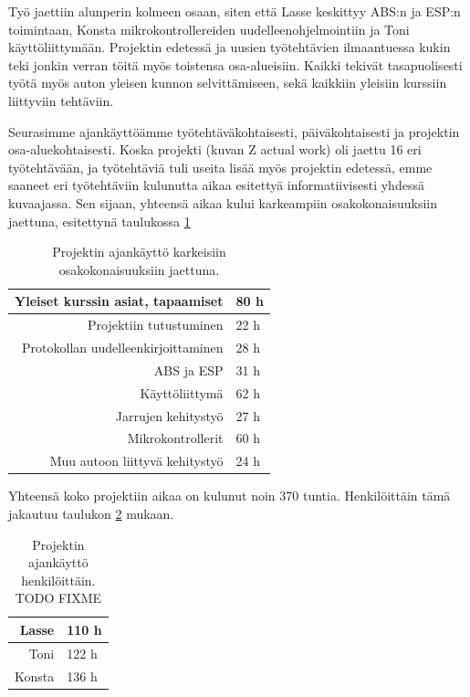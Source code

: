 \documentclass{article}
\begin{document}
Työ jaettiin alunperin kolmeen osaan, siten että Lasse keskittyy ABS:n ja ESP:n toimintaan, Konsta mikrokontrollereiden uudelleenohjelmointiin ja Toni käyttöliittymään. Projektin edetessä ja uusien työtehtävien ilmaantuessa kukin teki jonkin verran töitä myös toistensa osa-alueisiin. Kaikki tekivät tasapuolisesti työtä myös auton yleisen kunnon selvittämiseen, sekä kaikkiin yleisiin kurssiin liittyviin tehtäviin.

Seurasimme ajankäyttöämme työtehtäväkohtaisesti, päiväkohtaisesti ja projektin osa-aluekohtaisesti. Koska projekti (kuvan Z actual work) oli jaettu 16 eri työtehtävään, ja työtehtäviä tuli useita lisää myös projektin edetessä, emme saaneet eri työtehtäviin kulunutta aikaa esitettyä informatiivisesti yhdessä kuvaajassa. Sen sijaan, yhteensä aikaa kului karkeampiin osakokonaisuuksiin jaettuna, esitettynä taulukossa \ref{tab:osakok-ajat}

\begin{table}
	\caption{Projektin ajankäyttö karkeisiin osakokonaisuuksiin jaettuna.}
	\label{tab:osakok-ajat}
	\centering \begin{tabular}{ | r | l | } \hline
	Yleiset kurssin asiat, tapaamiset & 80 h\\ \hline
	Projektiin tutustuminen & 22 h\\ \hline
	Protokollan uudelleenkirjoittaminen & 28 h\\ \hline
	ABS ja ESP & 31 h\\ \hline
	Käyttöliittymä & 62 h\\ \hline
	Jarrujen kehitystyö & 27 h\\ \hline
	Mikrokontrollerit & 60 h\\ \hline
	Muu autoon liittyvä kehitystyö & 24 h\\ \hline
	\end{tabular}
\end{table}


Yhteensä koko projektiin aikaa on kulunut noin 370 tuntia. Henkilöittäin tämä jakautuu taulukon \ref{tab:henk-ajat} mukaan.

\begin{table}
	\caption{Projektin ajankäyttö henkilöittäin. TODO FIXME}
	\label{tab:henk-ajat}
	\centering \begin{tabular}{ | r | l | } \hline
	Lasse & 110 h\\ \hline
	Toni & 122 h\\ \hline
	Konsta & 136 h \\ \hline
	\end{tabular}
\end{table}
\end{document}

